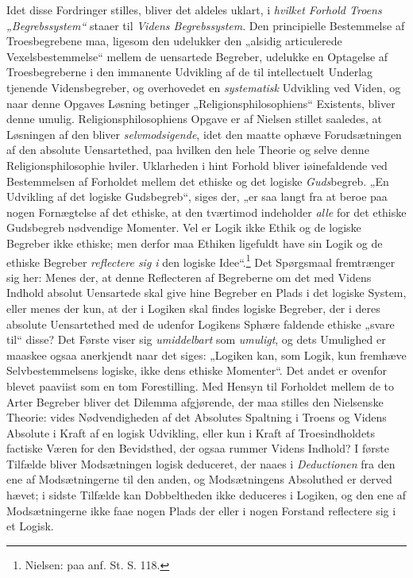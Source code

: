 \documentclass[12pt,a4paper]{book}
\newcommand{\opage}[1]{\marginnote{\footnotesize\textit{[#1]}}}
\begin{document}
Idet disse Fordringer stilles, bliver det aldeles uklart, i \emph{hvilket Forhold Troens „Begrebssystem“} staaer til \emph{Videns Begrebssystem}. Den principielle Bestemmelse af Troesbegrebene maa, ligesom den
udelukker den „alsidig articulerede Vexelsbestemmelse“ mellem de uensartede Begreber, udelukke en
Optagelse af Troesbegreberne i den immanente Udvikling af de til intellectuelt Underlag tjenende
Vidensbegreber, og overhovedet en \emph{systematisk} Udvikling ved Viden, og naar denne Opgaves
Løsning betinger „Religionsphilosophiens“ Existents, bliver denne \opage{208}umulig. Religionsphilosophiens
Opgave er af Nielsen stillet saaledes, at Løsningen af den bliver \emph{selvmodsigende}, idet den
maatte ophæve Forudsætningen af den absolute Uensartethed, paa hvilken den hele Theorie og selve
denne Religionsphilosophie hviler. Uklarheden i hint Forhold bliver iøinefaldende ved
Bestemmelsen af Forholdet mellem det ethiske og det logiske \emph{Guds}begreb. „En Udvikling af det
logiske Gudsbegreb“, siges der, „er saa langt fra at beroe paa nogen Fornægtelse af det ethiske,
at den tværtimod indeholder \emph{alle} for det ethiske Gudsbegreb nødvendige Momenter. Vel er Logik
ikke Ethik og de logiske Begreber ikke ethiske; men derfor maa Ethiken ligefuldt have sin Logik
og de ethiske Begreber \emph{reflectere sig i} den logiske Idee“.\footnote{Nielsen: paa anf. St. S. 118.} Det Spørgsmaal fremtrænger sig her: Menes der, at denne Reflecteren af Begreberne om det
med Videns Indhold absolut Uensartede skal give hine Begreber en Plads i det logiske System,
eller menes der kun, at der i Logiken skal findes logiske Begreber, der i deres absolute
Uensartethed med de udenfor Logikens Sphære faldende ethiske „svare til“ disse? Det Første viser sig \emph{umiddelbart} som \emph{umuligt}, og dets Umulighed er maaskee ogsaa anerkjendt naar det siges:
„Logiken kan, som Logik, kun fremhæve Selvbestemmelsens logiske, ikke dens ethiske Momenter“. Det
andet er ovenfor blevet paaviist som en tom Forestilling. Med Hensyn til Forholdet mellem de to
Arter Begreber bliver det Dilemma afgjørende, der maa stilles den Nielsenske Theorie: vides
Nødvendigheden af det Absolutes Spaltning i Troens og Videns Absolute i Kraft af en logisk
Udvikling, eller kun i Kraft af Troesindholdets factiske Væren for den Bevidsthed, der ogsaa
rummer Videns Indhold? I første Tilfælde bliver Modsætningen logisk deduceret, der naaes i \emph{Deductionen} fra den ene af Modsætningerne til den anden, og Modsætningens Absoluthed er derved
hævet; i sidste Tilfælde kan Dobbeltheden ikke deduceres i Logiken, og den ene af Modsætningerne
\opage{209}ikke faae nogen Plads der eller i nogen Forstand reflectere sig i et Logisk.
\end{document}
